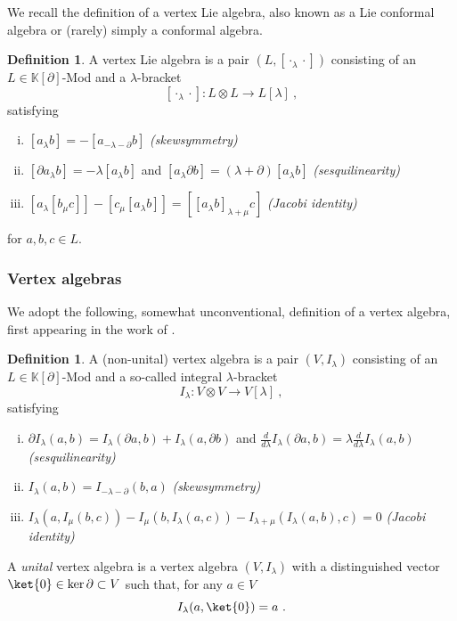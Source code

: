 \documentclass[11pt]{amsart}
\numberwithin{equation}{section}
\theoremstyle{definition}
\newtheorem{defn}[theo]{Definition}
\newcommand{\bb}{\mathbb}
\newcommand{\ik}{{\bb K}}
\newcommand{\0}{{\textbf{0}}}
\newcommand{\del}{{{\partial}}}
\begin{document}
We recall the definition of a vertex Lie algebra, also known as a Lie conformal algebra or (rarely) simply a conformal algebra.

\begin{defn}\label{defn:vertex Lie algebra}
	A vertex Lie algebra is a pair $(L,[\cdot_\lambda\cdot])$ consisting of an $L\in \ik[\partial]$-Mod and a $\lambda$-bracket
	\[
	[\cdot_\lambda \cdot]: L\otimes L \rightarrow L[\lambda]~,
	\]
	satisfying
	\begin{enumerate}[(i)]
		\item  $[{a}_\lambda b] = - [{a}_{-\lambda-\del} b]$ \emph{(skewsymmetry)}
		\item $[\partial {a}_\lambda b] = -\lambda [{a}_\lambda b]$ and $[{a}_\lambda \partial b] = (\lambda+\partial)[{a}_\lambda b]$ \emph{(sesquilinearity)}
		\item $[a_\lambda [b_\mu c]] - [c_\mu[a_\lambda b]]= [[a_\lambda b]_{\lambda+\mu} c]$ \emph{(Jacobi identity)}
	\end{enumerate}
	for $a,b,c\in L$.
\end{defn}
\subsubsection{Vertex algebras}

We adopt the following, somewhat unconventional, definition of a vertex algebra, first appearing in the work of  \cite{KacDeSole06}.
\begin{defn}
A (non-unital) vertex algebra is a pair $(V,I_\lambda)$ consisting of an $L\in \ik[\partial]$-Mod and a so-called integral $\lambda$-bracket
	\[
	I_\lambda: V\otimes V\rightarrow V[\lambda]~,
	\]
	satisfying
	\begin{enumerate}[(i)]
		\item $\partial I_\lambda(a,b) = I_\lambda(\partial a,b)+I_\lambda(a,\partial b)$ and $\tfrac{d}{d\lambda}I_\lambda(\partial a,b) = \lambda \tfrac{d}{d\lambda}I_\lambda(a,b)$ \emph{(sesquilinearity)}
		\item $I_\lambda(a,b) = I_{-\lambda-\partial}(b,a)$ \emph{(skewsymmetry)}
		\item $I_\lambda(a, I_\mu(b,c)) - I_\mu(b,I_\lambda(a,c)) - I_{\lambda+\mu}(I_\lambda(a,b),c) = 0$ \emph{(Jacobi identity)}
	\end{enumerate}
A \emph{unital} vertex algebra is a vertex algebra $(V,I_\lambda)$ with a distinguished vector $\ket{0}\in \ker\partial\subset V$ such that, for any $a\in V$
\[
I_\lambda(a,\ket{0})= a~.
\]
\end{defn}
\end{document}

